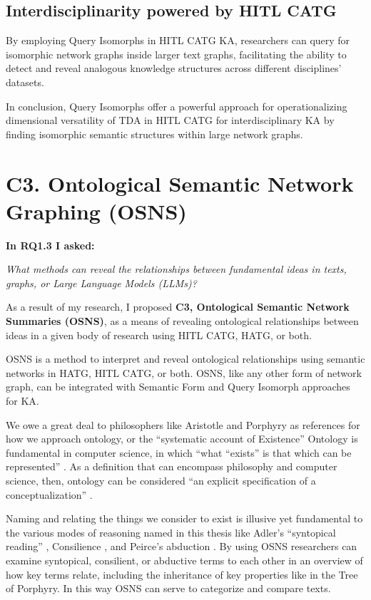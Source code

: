 \subsection{Interdisciplinarity powered by HITL CATG}

By employing Query Isomorphs in HITL CATG KA, researchers can query for isomorphic network graphs inside larger text graphs, facilitating the ability to detect and reveal analogous knowledge structures across different disciplines' datasets. 

In conclusion, Query Isomorphs offer a powerful approach for operationalizing dimensional versatility of TDA in HITL CATG for interdisciplinary KA by finding isomorphic semantic structures within large network graphs.
\section{C3. Ontological Semantic Network Graphing (OSNS) }
\noindent\textbf{In RQ1.3 I asked:}

\textit{What methods can reveal the relationships between fundamental ideas in texts, graphs, or Large Language Models (LLMs)?}

As a result of my research, I proposed \textbf{C3, Ontological Semantic Network Summaries (OSNS)}, as a means of revealing ontological relationships between ideas in a given body of research using HITL CATG, HATG, or both.

\vspace{1em}

OSNS is a method to interpret and reveal ontological relationships using semantic networks in HATG, HITL CATG, or both. OSNS, like any other form of network graph, can be integrated with Semantic Form and Query Isomorph approaches for KA. 

We owe a great deal to philosophers like Aristotle and Porphyry as references for how we approach ontology, or the “systematic account of Existence” \citep[p. 1]{gruber_toward_1995} Ontology is fundamental in computer science, in which “what “exists” is that which can be represented” \citep[p. 1]{gruber_toward_1995}. As a definition that can encompass philosophy and computer science, then, ontology can be considered “an explicit specification of a conceptualization” \citep[p. 1]{gruber_toward_1995}.

Naming and relating the things we consider to exist is illusive yet fundamental to the various modes of reasoning named in this thesis like Adler’s “syntopical reading” \citep[p. xi]{adler_great_1952-2}, Consilience \citep{hepburn_scientific_2021,wilson_consilience_1999}, and Peirce’s abduction \citep[p. 106]{peirce_pragmatism_1960} \citep[p. 20]{sowa_challenge_2004}.  By using OSNS researchers can examine syntopical, consilient, or abductive terms to each other in an overview of how key terms relate, including the inheritance of key properties like in the Tree of Porphyry. In this way OSNS can serve to categorize and compare texts.


